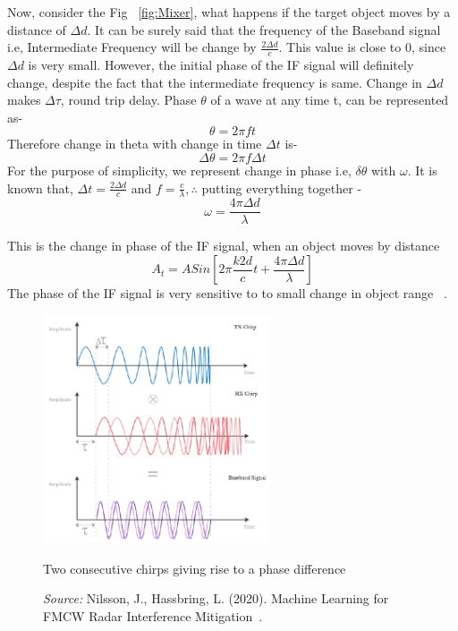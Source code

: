 Now, consider the Fig ~\ref{fig:Mixer}, what happens if the target object moves by a distance of $\Delta d$. It can be surely said that the frequency of the Baseband signal i.e, Intermediate Frequency will be change by $\frac{2\Delta d}{c}$. This value is close to 0, since $\Delta d$ is very small. However, the initial phase of the IF signal will definitely change, despite the fact that the intermediate frequency is same. Change in $\Delta d$ makes $\Delta\tau$, round trip delay.
Phase $\theta$ of a wave at any time t, can be represented as-
 \begin{equation}
     \theta= 2\pi ft
 \end{equation}
Therefore change in theta with change in time $\Delta t$ is-
 \begin{equation}
     \Delta\theta= 2\pi f\Delta t
 \end{equation}
 For the purpose of simplicity, we represent change in phase i.e, $\delta \theta$ with $\omega$. It is known that, $\Delta t= \frac{2\Delta d}{c}$ and $f= \frac{c}{\lambda},  \therefore$ putting everything together - 
 \begin{equation}\label{eq:theta}
     \omega= \frac{4\pi \Delta d}{\lambda}
 \end{equation} 

This is the change in phase of the IF signal, when an object moves by distance 
\begin{equation}\label{eq:eq1}
A_{t}= ASin[2\pi \frac{k2d}{c}t + \frac{4\pi \Delta d}{\lambda}]
\end{equation}
The phase of the IF signal is very sensitive to to small change in object range ~\cite{rao_2017}.

 \begin{figure}[ht]
  \begin{center}
    \includegraphics[width=0.6\textwidth]{Master's thesis/images/delay_sweeps.PNG} 
     
    \caption{Two consecutive chirps giving rise to a phase difference}
    \caption*{\textit{Source:} Nilsson, J., Hassbring, L. (2020). Machine Learning for FMCW Radar Interference Mitigation~\cite{nilsson2020machine}.}
    

    \label{fig:delay}
  \end{center}
\end{figure}  

